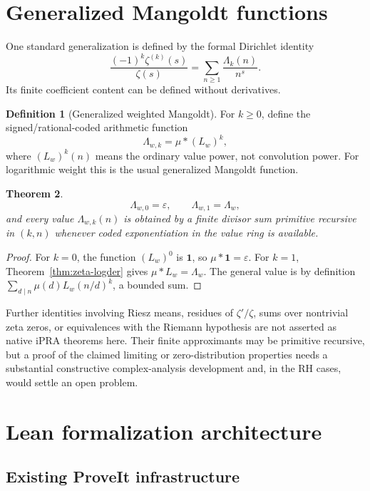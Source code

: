 \documentclass[11pt]{article}
\newtheorem{theorem}{Theorem}[section]
\theoremstyle{definition}
\newtheorem{definition}[theorem]{Definition}
\newcommand{\ipra}{\mathrm{iPRA}}
\begin{document}
\section{Generalized Mangoldt functions}

One standard generalization is defined by the formal Dirichlet identity
\[
 \frac{(-1)^k\zeta^{(k)}(s)}{\zeta(s)}
 =\sum_{n\ge1}\frac{\Lambda_k(n)}{n^s}.
\]
Its finite coefficient content can be defined without derivatives.

\begin{definition}[Generalized weighted Mangoldt]
For \(k\ge0\), define the signed/rational-coded arithmetic function
\[
 \Lambda_{w,k}=\mu*(L_w)^k,
\]
where \((L_w)^k(n)\) means the ordinary value power, not convolution power.
For logarithmic weight this is the usual generalized Mangoldt function.
\end{definition}

\begin{theorem}
\[
 \Lambda_{w,0}=\varepsilon,
 \qquad
 \Lambda_{w,1}=\Lambda_w,
\]
and every value \(\Lambda_{w,k}(n)\) is obtained by a finite divisor sum
primitive recursive in \((k,n)\) whenever coded exponentiation in the value
ring is available.
\end{theorem}

\begin{proof}
For \(k=0\), the function \((L_w)^0\) is \(\mathbf1\), so
\(\mu*\mathbf1=\varepsilon\).  For \(k=1\),
Theorem~\ref{thm:zeta-logder} gives \(\mu*L_w=\Lambda_w\).  The general value
is by definition
\(\sum_{d\mid n}\mu(d)L_w(n/d)^k\), a bounded sum.
\end{proof}

Further identities involving Riesz means, residues of \(\zeta'/\zeta\), sums
over nontrivial zeta zeros, or equivalences with the Riemann hypothesis are not
asserted as native \(\ipra\) theorems here.  Their finite approximants may be
primitive recursive, but a proof of the claimed limiting or zero-distribution
properties needs a substantial constructive complex-analysis development and,
in the RH cases, would settle an open problem.

\section{Lean formalization architecture}

\subsection{Existing ProveIt infrastructure}
\end{document}
